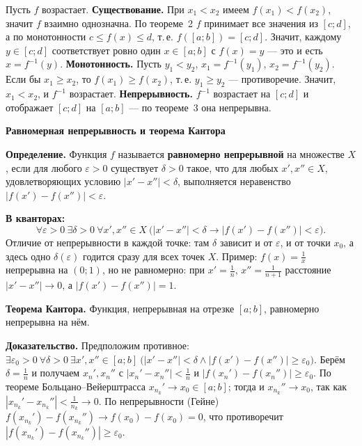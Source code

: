 \documentclass[a4paper,11pt]{article}
\newcommand{\eps}{\varepsilon}
\newcommand{\kv}{\par\noindent\textbf{\textcolor{oprc!85!black}{В кванторах:}}}
\newcommand{\podr}[1]{\par\needspace{8\baselineskip}\medskip
  {\large\bfseries\textcolor{oprc!80!black}{#1}}\par\nopagebreak\smallskip}
\begin{document}
\begin{dop}
Пусть $f$ возрастает. \textbf{Существование.} При $x_1 < x_2$ имеем $f(x_1) < f(x_2)$, значит $f$ взаимно однозначна.
По теореме~2 $f$ принимает все значения из $[c; d]$, а по монотонности $c \le f(x) \le d$, т.\,е. $f([a; b]) = [c; d]$.
Значит, каждому $y \in [c; d]$ соответствует ровно один $x \in [a; b]$ с $f(x) = y$ --- это и есть $x = f^{-1}(y)$.
\textbf{Монотонность.} Пусть $y_1 < y_2$, $x_1 = f^{-1}(y_1)$, $x_2 = f^{-1}(y_2)$. Если бы $x_1 \ge x_2$, то $f(x_1) \ge f(x_2)$,
т.\,е. $y_1 \ge y_2$ --- противоречие. Значит, $x_1 < x_2$, и $f^{-1}$ возрастает.
\textbf{Непрерывность.} $f^{-1}$ возрастает на $[c; d]$ и отображает $[c; d]$ на $[a; b]$ --- по теореме~3 она непрерывна.
\end{dop}

\podr{Равномерная непрерывность и теорема Кантора}

\begin{dop}
\textbf{Определение.} Функция $f$ называется \textbf{равномерно непрерывной} на множестве $X$, если для любого $\eps > 0$
существует $\delta > 0$ такое, что для любых $x', x'' \in X$, удовлетворяющих условию $|x' - x''| < \delta$,
выполняется неравенство $|f(x') - f(x'')| < \eps$.
\kv
\[
  \forall \eps > 0\ \exists \delta > 0\ \forall x', x'' \in X\ \bigl( |x' - x''| < \delta \to |f(x') - f(x'')| < \eps \bigr).
\]
Отличие от непрерывности в каждой точке: там $\delta$ зависит и от $\eps$, и от точки $x_0$, а здесь одно $\delta(\eps)$
годится сразу для всех точек $X$. Пример: $f(x) = \frac1x$ непрерывна на $(0; 1)$, но не равномерно: при $x' = \frac1n$,
$x'' = \frac1{n+1}$ расстояние $|x' - x''| \to 0$, а $|f(x') - f(x'')| = 1$.

\textbf{Теорема Кантора.} Функция, непрерывная на отрезке $[a; b]$, равномерно непрерывна на нём.

\textbf{Доказательство.} Предположим противное:
$\exists \eps_0 > 0\ \forall \delta > 0\ \exists x', x'' \in [a; b]\ \bigl(|x' - x''| < \delta \wedge |f(x') - f(x'')| \ge \eps_0\bigr)$.
Берём $\delta = \frac1n$ и получаем $x_n', x_n''$ с $|x_n' - x_n''| < \frac1n$ и $|f(x_n') - f(x_n'')| \ge \eps_0$.
По теореме Больцано--Вейерштрасса $x_{n_k}' \to x_0 \in [a; b]$; тогда и $x_{n_k}'' \to x_0$, так как $|x_{n_k}' - x_{n_k}''| < \frac1{n_k} \to 0$.
По непрерывности (Гейне) $f(x_{n_k}') - f(x_{n_k}'') \to f(x_0) - f(x_0) = 0$, что противоречит $|f(x_{n_k}') - f(x_{n_k}'')| \ge \eps_0$.
\end{dop}
\end{document}
